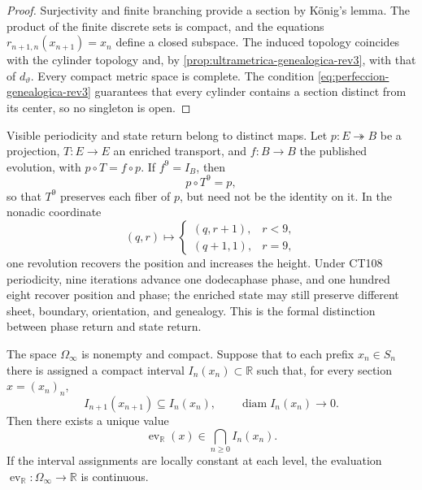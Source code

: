 \begin{proof}
Surjectivity and finite branching provide a section by König's lemma. The product of the finite discrete sets is compact, and the equations \(r_{n+1,n}(x_{n+1})=x_n\) define a closed subspace. The induced topology coincides with the cylinder topology and, by \cref{prop:ultrametrica-genealogica-rev3}, with that of \(d_\vartheta\). Every compact metric space is complete. The condition \eqref{eq:perfeccion-genealogica-rev3} guarantees that every cylinder contains a section distinct from its center, so no singleton is open.
\end{proof}

Visible periodicity and state return belong to distinct
maps. Let \(p:E\twoheadrightarrow B\) be a projection, \(T:E\to E\) an
enriched transport, and \(f:B\to B\) the published evolution, with
\(p\circ T=f\circ p\). If \(f^9=I_B\), then
\begin{equation}
 p\circ T^9=p,
 \label{eq:retorno-visible-fibra-rev3}
\end{equation}
so that \(T^9\) preserves each fiber of \(p\), but need not be
the identity on it. In the nonadic coordinate
\[
 (q,r)\longmapsto
 \begin{cases}
  (q,r+1),&r<9,\\
  (q+1,1),&r=9,
 \end{cases}
\]
one revolution recovers the position and increases the height. Under CT108
periodicity, nine iterations advance one dodecaphase phase, and one hundred eight
recover position and phase; the enriched state may still preserve
different sheet, boundary, orientation, and genealogy. This is the formal
distinction between phase return and state return.

\begin{theorem}
\label{thm:reconstruccion-continuo-secciones-rev2}
The space \(\Omega_\infty\) is nonempty and compact. Suppose that to each
prefix \(x_n\in S_n\) there is assigned a compact interval
\(I_n(x_n)\subset\mathbb R\) such that, for every section
\(x=(x_n)_n\),
\[
 I_{n+1}(x_{n+1})\subseteq I_n(x_n),
 \qquad
 \operatorname{diam}I_n(x_n)\longrightarrow0.
\]
Then there exists a unique value
\begin{equation}
 \operatorname{ev}_{\mathbb R}(x)
 \in\bigcap_{n\geq0}I_n(x_n).
 \label{eq:evaluacion-seccion-continua-rev2}
\end{equation}
If the interval assignments are locally constant at each level, the
evaluation \(\operatorname{ev}_{\mathbb R}:\Omega_\infty\to\mathbb R\) is
continuous.
\end{theorem}

